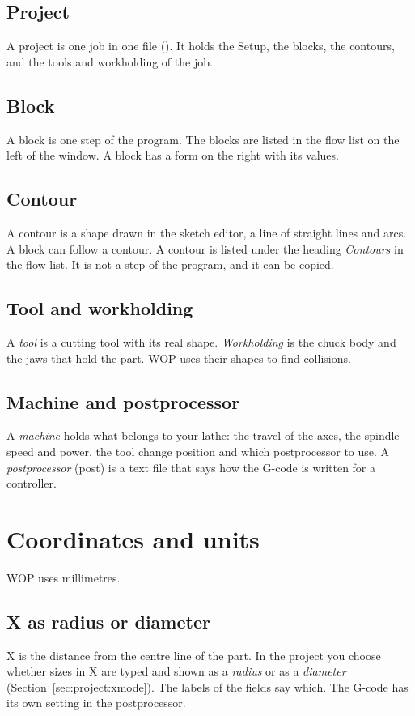 \subsection{Project}
A project is one job in one file (). It holds the Setup, the blocks, the contours, and the tools and workholding of the job.

\subsection{Block}
A block is one step of the program. The blocks are listed in the flow list on the left of the window. A block has a form on the right with its values.

\subsection{Contour}
A contour is a shape drawn in the sketch editor, a line of straight lines and arcs. A block can follow a contour. A contour is listed under the heading \emph{Contours} in the flow list. It is not a step of the program, and it can be copied.

\subsection{Tool and workholding}
A \emph{tool} is a cutting tool with its real shape. \emph{Workholding} is the chuck body and the jaws that hold the part. WOP uses their shapes to find collisions.

\subsection{Machine and postprocessor}
A \emph{machine} holds what belongs to your lathe: the travel of the axes, the spindle speed and power, the tool change position and which postprocessor to use. A \emph{postprocessor} (post) is a text file that says how the G-code is written for a controller.

\section{Coordinates and units}
WOP uses millimetres.

\subsection{X as radius or diameter}
X is the distance from the centre line of the part. In the project you choose whether sizes in X are typed and shown as a \emph{radius} or as a \emph{diameter} (Section~\ref{sec:project:xmode}). The labels of the fields say which. The G-code has its own setting in the postprocessor.

